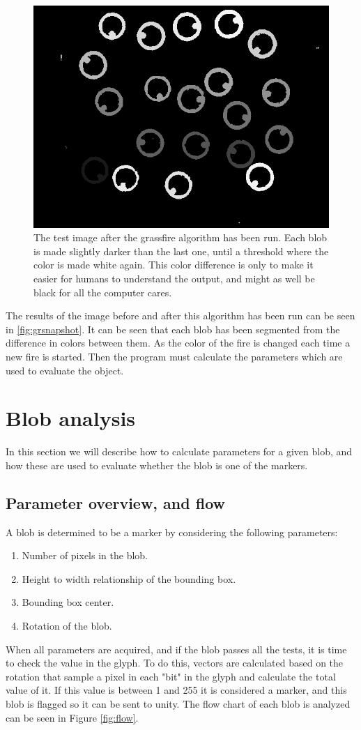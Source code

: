 \begin{figure}[H]
	\centering
	\includegraphics[width=0.6\linewidth]{figure/Analysis/grassfire.png}
	\caption{The test image after the grassfire algorithm has been run. Each blob is made slightly darker than the last one, until a threshold where the color is made white again. This color difference is only to make it easier for humans to understand the output, and might as well be black for all the computer cares.}
	\label{fig:grsnapshot}
\end{figure} 
The results of the image before and after this algorithm has been run can be seen in \autoref{fig:grsnapshot}. It can be seen that each blob has been segmented from the difference in colors between them. As the color of the fire is changed each time a new fire is started. Then the program must calculate the parameters which are used to evaluate the object.
\section{Blob analysis}
In this section we will describe how to calculate parameters for a given blob, and how these are used to evaluate whether the blob is one of the markers.
\subsection{Parameter overview, and flow}
A blob is determined to be a marker by considering the following parameters:
\begin{enumerate}
	\item Number of pixels in the blob.
	\item Height to width relationship of the bounding box.
	\item Bounding box center.
	\item Rotation of the blob.
\end{enumerate}
When all parameters are acquired, and if the blob passes all the tests, it is time to check the value in the glyph. To do this, vectors are calculated based on the rotation that sample a pixel in each "bit" in the glyph and calculate the total value of it. If this value is between 1 and 255 it is considered a marker, and this blob is flagged so it can be sent to unity. The flow chart of each blob is analyzed can be seen in Figure \ref{fig:flow}.

